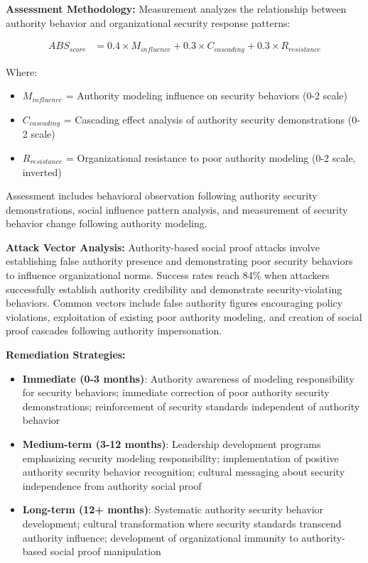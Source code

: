 \documentclass[11pt,a4paper]{article}
\begin{document}
\textbf{Assessment Methodology:}
Measurement analyzes the relationship between authority behavior and organizational security response patterns:

\begin{align}
ABS_{score} &= 0.4 \times M_{influence} + 0.3 \times C_{cascading} + 0.3 \times R_{resistance}
\end{align}

Where:
\begin{itemize}
\item $M_{influence}$ = Authority modeling influence on security behaviors (0-2 scale)
\item $C_{cascading}$ = Cascading effect analysis of authority security demonstrations (0-2 scale)
\item $R_{resistance}$ = Organizational resistance to poor authority modeling (0-2 scale, inverted)
\end{itemize}

Assessment includes behavioral observation following authority security demonstrations, social influence pattern analysis, and measurement of security behavior change following authority modeling.

\textbf{Attack Vector Analysis:}
Authority-based social proof attacks involve establishing false authority presence and demonstrating poor security behaviors to influence organizational norms. Success rates reach 84\% when attackers successfully establish authority credibility and demonstrate security-violating behaviors. Common vectors include false authority figures encouraging policy violations, exploitation of existing poor authority modeling, and creation of social proof cascades following authority impersonation.

\textbf{Remediation Strategies:}
\begin{itemize}
\item \textbf{Immediate (0-3 months)}: Authority awareness of modeling responsibility for security behaviors; immediate correction of poor authority security demonstrations; reinforcement of security standards independent of authority behavior
\item \textbf{Medium-term (3-12 months)}: Leadership development programs emphasizing security modeling responsibility; implementation of positive authority security behavior recognition; cultural messaging about security independence from authority social proof
\item \textbf{Long-term (12+ months)}: Systematic authority security behavior development; cultural transformation where security standards transcend authority influence; development of organizational immunity to authority-based social proof manipulation
\end{itemize}
\end{document}
